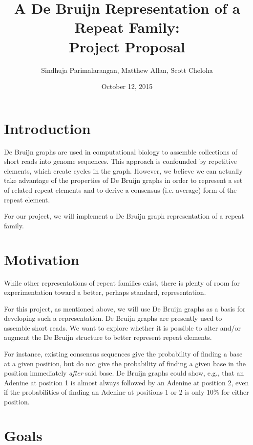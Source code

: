 \documentclass[dvips,12pt]{article}
\begin{document}
\title{A De Bruijn Representation of a Repeat Family:\\Project Proposal}
\author{Sindhuja Parimalarangan, Matthew Allan, Scott Cheloha}
\date{October 12, 2015}

\maketitle

\section{Introduction}

De Bruijn graphs are used in computational biology to assemble
collections of short reads into genome sequences. This approach is
confounded by repetitive elements, which create cycles in the
graph. However, we believe we can actually take advantage of the
properties of De Bruijn graphs in order to represent a set of related
repeat elements and to derive a consensus (i.e. average) form of the
repeat element.

For our project, we will implement a De Bruijn graph representation of a
repeat family.

\section{Motivation}

While other representations of repeat families exist, there is plenty of
room for experimentation toward a better, perhaps standard,
representation.

For this project, as mentioned above, we will use De Bruijn graphs as a
basis for developing such a representation.  De Bruijn graphs are
presently used to assemble short reads.  We want to explore whether it
is possible to alter and/or augment the De Bruijn structure to
better represent repeat elements.

For instance, existing consensus sequences give the probability of
finding a base at a given position, but do not give the probability of
finding a given base in the position immediately \emph{after} said base.
De Bruijn graphs could show, e.g., that an Adenine at position 1 is
almost always followed by an Adenine at position 2, even if the
probabilities of finding an Adenine at positions 1 or 2 is only 10\% for
either position.

\section{Goals}
\end{document}
